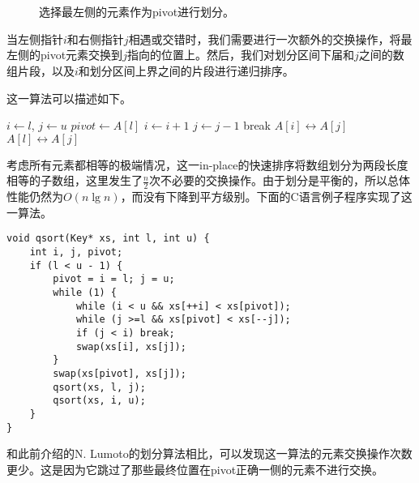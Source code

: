 \documentclass[UTF8]{article}
\begin{document}
\begin{figure}[htbp]
   \centering
    \\
    \\
   \caption{选择最左侧的元素作为pivot进行划分。}
   \label{fig:partition-2-way}
\end{figure}

当左侧指针$i$和右侧指针$j$相遇或交错时，我们需要进行一次额外的交换操作，将最左侧的pivot元素交换到$j$指向的位置上。然后，我们对划分区间下届和$j$之间的数组片段，以及$i$和划分区间上界之间的片段进行递归排序。

这一算法可以描述如下。

\begin{algorithmic}[1]
 \Comment{sort range $[l, u)$}
   
    \State $i \gets l$, $j \gets u$
    \State $pivot \gets A[l]$
    \Loop
      \Repeat
        \State $i \gets i + 1$
       
      \Repeat
        \State $j \gets j - 1$
       
        \State break
      \EndIf
      \State {} $A[i] \leftrightarrow A[j]$
    \EndLoop
    \State {} $A[l] \leftrightarrow A[j]$ 
    \State {}
    \State {}
  \EndIf
\EndProcedure
\end{algorithmic}

考虑所有元素都相等的极端情况，这一in-place的快速排序将数组划分为两段长度相等的子数组，这里发生了$\frac{n}{2}$次不必要的交换操作。由于划分是平衡的，所以总体性能仍然为$O(n \lg n)$，而没有下降到平方级别。下面的C语言例子程序实现了这一算法。

\lstset{language=C}
\begin{lstlisting}
void qsort(Key* xs, int l, int u) {
    int i, j, pivot;
    if (l < u - 1) {
        pivot = i = l; j = u;
        while (1) {
            while (i < u && xs[++i] < xs[pivot]);
            while (j >=l && xs[pivot] < xs[--j]);
            if (j < i) break;
            swap(xs[i], xs[j]);
        }
        swap(xs[pivot], xs[j]);
        qsort(xs, l, j);
        qsort(xs, i, u);
    }
}
\end{lstlisting}

和此前介绍的N. Lumoto的划分算法相比，可以发现这一算法的元素交换操作次数更少。这是因为它跳过了那些最终位置在pivot正确一侧的元素不进行交换。
\end{document}
